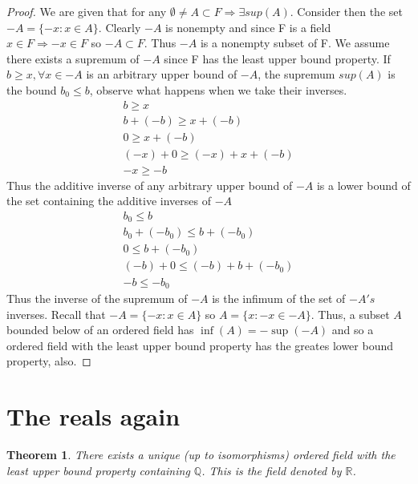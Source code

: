 \documentclass[12pt]{article}
\newtheorem{theorem}{Theorem}
\begin{document}
\begin{proof}
    We are given that for any \(\emptyset \neq A \subset F \Rightarrow \exists sup(A)\). 
    Consider then the set \(-A = \{-x : x\in A\}\). 
    Clearly \(-A\) is nonempty and since F is a field \(x\in F \Rightarrow -x \in F\) so 
    \(-A \subset F\). Thus \(-A\) is a nonempty subset of F. 
    We assume there exists a supremum of \(-A\) since F has 
    the least upper bound property.
    If \(b \geq x, \forall x \in -A\) is an arbitrary upper bound of \(-A\), 
    the supremum \(sup(A)\) is the bound 
    \(b_0 \leq b\), observe what happens when we take their inverses. 
    \begin{gather*}
        b \geq x \\ 
        b + (-b) \geq x + (-b) \\ 
        0 \geq x + (-b) \\ 
        (-x) + 0 \geq (-x) + x + (-b) \\ 
        -x \geq -b
    \end{gather*}
    Thus the additive inverse of any arbitrary upper bound of \(-A\) is a lower bound of 
    the set containing the additive inverses of \(-A\)
    \begin{gather*}
        b_0 \leq b \\ 
        b_0 + (-b_0) \leq b + (-b_0) \\ 
        0 \leq b +(-b_0) \\ 
        (-b) + 0\leq (-b) + b + (-b_0) \\ 
        -b \leq -b_0
    \end{gather*} 
    Thus the inverse of the supremum of \(-A\) is the infimum of the set of \(-A's\) inverses. 
    Recall that \(-A = \{-x : x \in A\}\) so \(A = \{x : -x \in -A\}\). 
    Thus, a subset \(A\) bounded below of an ordered field has \(\inf(A) = -\sup(-A)\) 
    and so a ordered field with the least upper bound property has the greates lower
    bound property, also.

\end{proof}

\break
\section*{The reals again}
\begin{theorem}
    There exists a unique (up to isomorphisms) ordered field with the least upper bound 
    property containing \(\mathbb Q\). This is the field denoted by \(\mathbb R\).
\end{theorem}
\end{document}
